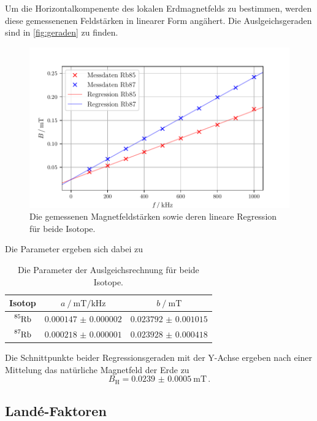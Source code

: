 Um die Horizontalkompenente des lokalen Erdmagnetfelds zu bestimmen,
werden diese gemessenenen Feldstärken in linearer Form angähert. 
Die Auslgeichsgeraden sind in \autoref{fig:geraden} zu finden.
\begin{figure}
    \centering
    \includegraphics[width = 0.8\linewidth]{build/geraden.pdf}
    \caption{Die gemessenen Magnetfeldstärken sowie deren lineare Regression für beide Isotope.}
    \label{fig:geraden}
\end{figure}
Die Parameter ergeben sich dabei zu 
\begin{table}
    \centering
    \caption{Die Parameter der Auslgeichsrechnung für beide Isotope.}
    \begin{tabular}{c c c}
        \toprule 
        Isotop &
        $a \mathbin{/} \unit{\milli\tesla\per\kilo\hertz}$ &
        $b \mathbin{/} \unit{\milli\tesla}$ \\
        \midrule
        $\ce{^{85}_{}Rb}$ & $\num{0.000147(2)}$ & $\num{0.023792(1015)}$ \\
        $\ce{^{87}_{}Rb}$ & $\num{0.000218(1)}$ & $\num{0.023928(418)}$ \\
        \bottomrule
    \end{tabular}
\end{table}

Die Schnittpunkte beider Regressionsgeraden mit der Y-Achse ergeben
nach einer Mittelung das natürliche Magnetfeld der Erde zu
\begin{equation*}
    B_\text{H} = \qty{0.0239(5)}{\milli\tesla} \, .
\end{equation*}


\subsection{Landé-Faktoren}

